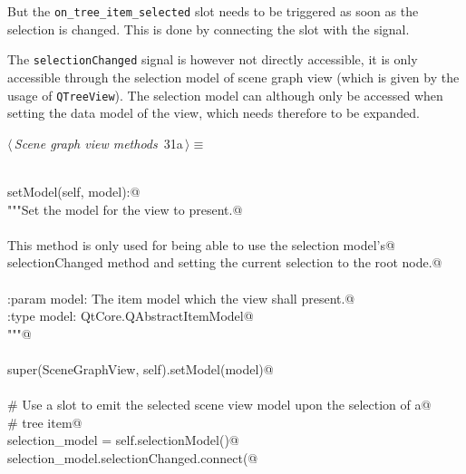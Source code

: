 \documentclass[
    a4paper,      %
    10pt,         %
    openright,    %
    notitlepage,  %
    parskip=half, %
]{scrreprt}       %
\theoremstyle{definition}                    %
\begin{document}
But the \verb+on_tree_item_selected+ slot needs to be triggered as soon as the
selection is changed. This is done by connecting the slot with the signal.

The \verb+selectionChanged+ signal is however not directly accessible, it is
only accessible through the selection model of scene graph view (which is given
by the usage of \verb+QTreeView+). The selection model can although only be
accessed when setting the data model of the view, which needs therefore to be
expanded.

\begin{flushleft} \small
\begin{minipage}{\linewidth}\label{scrap31}\raggedright\small
{} $\langle\,${\itshape Scene graph view methods}\nobreak\ {\footnotesize {31a}}$\,\rangle\equiv$
\vspace{-1ex}
\begin{list}{}{} \item
\mbox{}\lstinline@@\\
\mbox{}\lstinline@def setModel(self, model):@\\
\mbox{}\lstinline@    """Set the model for the view to present.@\\
\mbox{}\lstinline@@\\
\mbox{}\lstinline@    This method is only used for being able to use the selection model's@\\
\mbox{}\lstinline@    selectionChanged method and setting the current selection to the root node.@\\
\mbox{}\lstinline@@\\
\mbox{}\lstinline@    :param model: The item model which the view shall present.@\\
\mbox{}\lstinline@    :type  model: QtCore.QAbstractItemModel@\\
\mbox{}\lstinline@    """@\\
\mbox{}\lstinline@@\\
\mbox{}\lstinline@    super(SceneGraphView, self).setModel(model)@\\
\mbox{}\lstinline@@\\
\mbox{}\lstinline@    # Use a slot to emit the selected scene view model upon the selection of a@\\
\mbox{}\lstinline@    # tree item@\\
\mbox{}\lstinline@    selection_model = self.selectionModel()@\\
\mbox{}\lstinline@    selection_model.selectionChanged.connect(@\\

\end{list}
\end{minipage}
\end{flushleft}
\end{document}
